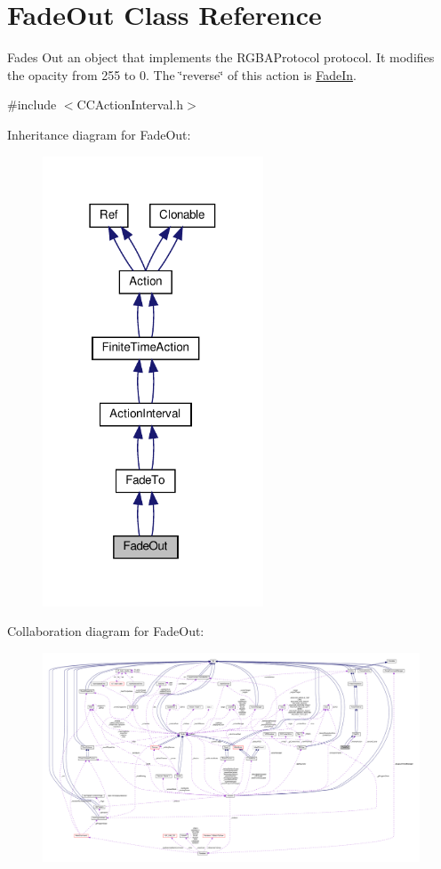 \hypertarget{classFadeOut}{}\section{Fade\+Out Class Reference}
\label{classFadeOut}


Fades Out an object that implements the R\+G\+B\+A\+Protocol protocol. It modifies the opacity from 255 to 0. The \char`\"{}reverse\char`\"{} of this action is \hyperlink{classFadeIn}{Fade\+In}.  




{\ttfamily \#include $<$C\+C\+Action\+Interval.\+h$>$}



Inheritance diagram for Fade\+Out\+:
\nopagebreak
\begin{figure}[H]
\begin{center}
\leavevmode
\includegraphics[width=186pt]{classFadeOut__inherit__graph}
\end{center}
\end{figure}


Collaboration diagram for Fade\+Out\+:
\nopagebreak
\begin{figure}[H]
\begin{center}
\leavevmode
\includegraphics[width=350pt]{classFadeOut__coll__graph}
\end{center}
\end{figure}
